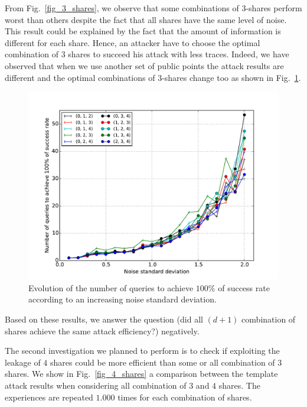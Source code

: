 \documentclass{llncs}
\begin{document}
From Fig.~\ref{fig_3_shares}, we observe that some combinations of $3$-shares perform worst than others despite the fact that all shares have the same level of noise. This result could be explained by the fact that the amount of information is different for each share. Hence, an attacker have to choose the optimal combination of $3$ shares to succeed his attack with less traces. Indeed, we have observed that when we use another set of public points the attack results are different and the optimal combinations of $3$-shares change too as shown in Fig.~\ref{fig_3_shares_bis}.    

\begin{figure}
\begin{center}
\includegraphics[width=1\textwidth]{Figure/res_86_23_115_107_189.pdf}
\caption{Evolution of the number of queries to achieve $100\%$ of success rate according to an increasing noise standard deviation.}
\label{fig_3_shares_bis}
\end{center}
\end{figure}

Based on these results, we answer the question (did all $(d+1)$ combination of shares achieve the same attack efficiency?) negatively.

The second investigation we planned to perform is to check if exploiting the leakage of $4$ shares could be more efficient than some or all combination of $3$ shares. We show in Fig.~\ref{fig_4_shares} a comparison between the template attack results when considering all combination of $3$ and $4$ shares. The experiences are repeated $1.000$ times for each combination of shares.
\end{document}
